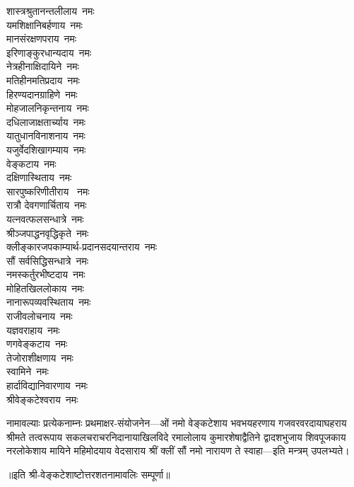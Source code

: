 \begin{multicols}{2}
\begin{flushleft}
शास्त्रश्रुतानन्तलीलाय~नमः\\
यमशिक्षानिबर्हणाय~नमः\\
मानसंरक्षणपराय~नमः\\
इरिणाङ्कुरधान्यदाय~नमः\\
नेत्रहीनाक्षिदायिने~नमः\\
मतिहीनमतिप्रदाय~नमः\\
हिरण्यदानग्राहिणे~नमः\\
मोहजालनिकृन्तनाय~नमः\\
दधिलाजाक्षतार्च्याय~नमः\\
यातुधानविनाशनाय~नमः\hfill{}\\
                                                        
यजुर्वेदशिखागम्याय~नमः\\
वेङ्कटाय~नमः\\
दक्षिणास्थिताय~नमः\\
सारपुष्करिणीतीराय ~नमः\\
रात्रौ  देवगणार्चिताय~नमः\\
यत्नवत्फलसन्धात्रे~नमः\\
श्रीञ्जपाद्धनवृद्धिकृते~नमः\\
क्लीङ्कारजपकाम्यार्थ-प्रदानसदयान्तराय~नमः\\
सौं सर्वसिद्धिसन्धात्रे~नमः\\
नमस्कर्तुरभीष्टदाय~नमः\hfill{}\\
        
मोहितखिललोकाय~नमः\\
नानारूपव्यवस्थिताय~नमः\\
राजीवलोचनाय~नमः\\
यज्ञवराहाय~नमः\\
णगवेङ्कटाय~नमः\\
तेजोराशीक्षणाय~नमः\\
स्वामिने~नमः\\
हार्दाविद्यानिवारणाय~नमः\hfill{}\\
श्रीवेङ्कटेश्वराय~नमः\\
    \end{flushleft}
\end{multicols}

नामावल्याः प्रत्येकनाम्नः प्रथमाक्षर-संयोजनेन---ओं नमो वेङ्कटेशाय
भवभयहरणाय
गजवरवरदायाघहराय
श्रीमते तत्वरूपाय
सकलचराचरनिदानायाखिलविदे
रमालोलाय
कुमारशेषाद्वैतिने
द्वादशभुजाय
शिवपूजकाय
नरलोकेशाय
मायिने
महिमोदयाय
वेदसाराय
श्रीं क्लीं सौं
नमो नारायण ते स्वाहा---इति मन्त्रम् उपलभ्यते।

॥इति श्री-वेङ्कटेशाष्टोत्तरशतनामावलिः सम्पूर्णा॥
